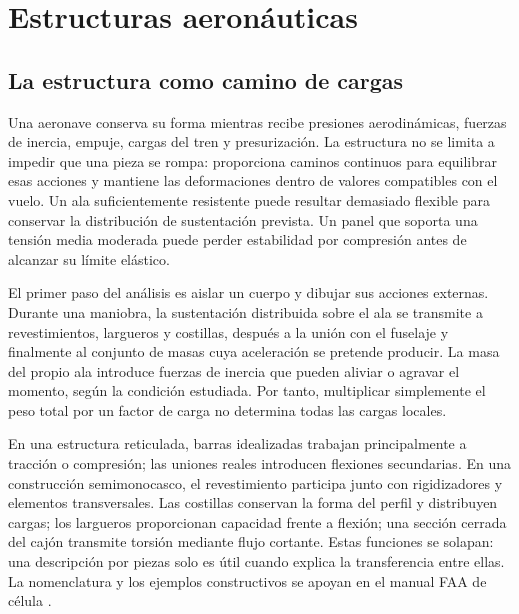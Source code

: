 \chapter{Estructuras aeronáuticas}\label{ch:16}

\section{La estructura como camino de cargas}
Una aeronave conserva su forma mientras recibe presiones aerodinámicas, fuerzas de inercia, empuje, cargas del tren y presurización. La estructura no se limita a impedir que una pieza se rompa: proporciona caminos continuos para equilibrar esas acciones y mantiene las deformaciones dentro de valores compatibles con el vuelo. Un ala suficientemente resistente puede resultar demasiado flexible para conservar la distribución de sustentación prevista. Un panel que soporta una tensión media moderada puede perder estabilidad por compresión antes de alcanzar su límite elástico.

El primer paso del análisis es aislar un cuerpo y dibujar sus acciones externas. Durante una maniobra, la sustentación distribuida sobre el ala se transmite a revestimientos, largueros y costillas, después a la unión con el fuselaje y finalmente al conjunto de masas cuya aceleración se pretende producir. La masa del propio ala introduce fuerzas de inercia que pueden aliviar o agravar el momento, según la condición estudiada. Por tanto, multiplicar simplemente el peso total por un factor de carga no determina todas las cargas locales.

En una estructura reticulada, barras idealizadas trabajan principalmente a tracción o compresión; las uniones reales introducen flexiones secundarias. En una construcción semimonocasco, el revestimiento participa junto con rigidizadores y elementos transversales. Las costillas conservan la forma del perfil y distribuyen cargas; los largueros proporcionan capacidad frente a flexión; una sección cerrada del cajón transmite torsión mediante flujo cortante. Estas funciones se solapan: una descripción por piezas solo es útil cuando explica la transferencia entre ellas. La nomenclatura y los ejemplos constructivos se apoyan en el manual FAA de célula \cite{FAA-AIRFRAME}.


